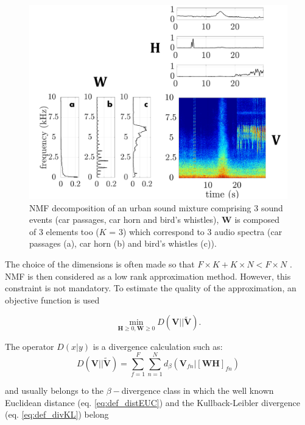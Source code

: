 \documentclass[twocolumn]{svjour3}          %
\begin{document}
\begin{figure}[t]
\centering
\includegraphics[width=0.9\linewidth]{figures/schema_introduction_nmf.pdf}
\caption{NMF decomposition of an urban sound mixture comprising 3 sound events (car passages, car horn and bird's whistles), $\mathbf{W}$ is composed of 3 elements too ($K$ = 3) which correspond to 3 audio spectra (car passages (a), car horn (b) and bird's whistles (c)).}
\label{fig:example_NMF}
\end{figure}

The choice of the dimensions is often made so that $F\times K + K \times N < F \times N$ \cite{fevotte_nonnegative_2009}. NMF is then considered as a low rank approximation method. However, this constraint is not mandatory. To estimate the quality of the approximation, an objective function is used

\begin{equation}\label{eq:min-D-WH}
\underset{\mathbf{H} \geq 0, \mathbf{W} \geq 0}{\min} D\left(\mathbf{V} \vert \vert \mathbf{\tilde{V}}\right).
\end{equation}

The operator $D(x\vert y)$ is a divergence calculation such as:
\begin{equation}
D\left(\textbf{V} \vert\vert \mathbf{\tilde{V}} \right) = \sum_{f = 1}^{F} \sum_{n = 1}^{N} d_{\beta}
\left(\textbf{V}_{fn} \vert \left[ \textbf{WH} \right]_{fn} \right)
\end{equation}

and usually belongs to the $\beta-$divergence class \cite{fevotte_nonnegative_2009} in which the well known Euclidean distance (eq. \ref{eq:def_distEUC}) and the Kullback-Leibler divergence (eq. \ref{eq:def_divKL}) belong
\end{document}
